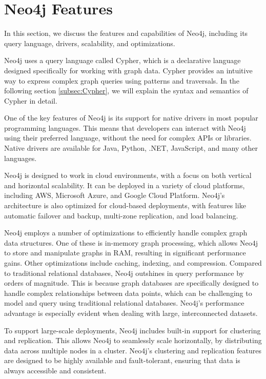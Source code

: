 
\section{Neo4j Features} \label{sec:features}

In this section, we discuss the features and capabilities of Neo4j, including its query language, drivers, scalability, and optimizations.

Neo4j uses a query language called Cypher, which is a declarative language designed specifically for working with graph data. Cypher provides an intuitive way to express complex graph queries using patterns and traversals. In the following section \ref{subsec:Cypher}, we will explain the syntax and semantics of Cypher in detail.

One of the key features of Neo4j is its support for native drivers in most popular programming languages. This means that developers can interact with Neo4j using their preferred language, without the need for complex APIs or libraries. Native drivers are available for Java, Python, .NET, JavaScript, and many other languages. \parencite{neo4j:mainpage}

Neo4j is designed to work in cloud environments, with a focus on both vertical and horizontal scalability. It can be deployed in a variety of cloud platforms, including AWS, Microsoft Azure, and Google Cloud Platform. Neo4j's architecture is also optimized for cloud-based deployments, with features like automatic failover and backup, multi-zone replication, and load balancing. \parencite{neo4j:mainpage}

Neo4j employs a number of optimizations to efficiently handle complex graph data structures. One of these is in-memory graph processing, which allows Neo4j to store and manipulate graphs in RAM, resulting in significant performance gains. Other optimizations include caching, indexing, and compression.
Compared to traditional relational databases, Neo4j outshines in query performance by orders of magnitude. This is because graph databases are specifically designed to handle complex relationships between data points, which can be challenging to model and query using traditional relational databases. Neo4j's performance advantage is especially evident when dealing with large, interconnected datasets. \parencite{performance}

To support large-scale deployments, Neo4j includes built-in support for clustering and replication. This allows Neo4j to seamlessly scale horizontally, by distributing data across multiple nodes in a cluster. Neo4j's clustering and replication features are designed to be highly available and fault-tolerant, ensuring that data is always accessible and consistent. \parencite{noe4j:clustering}

